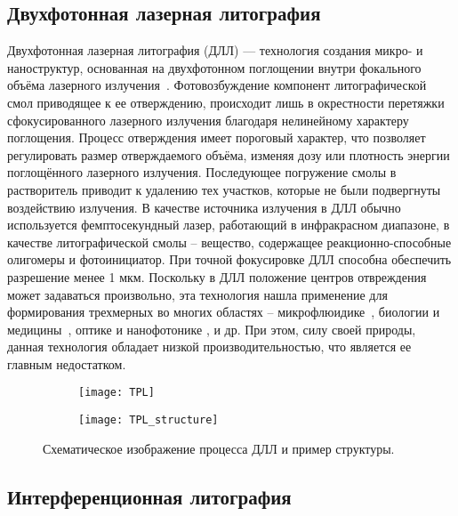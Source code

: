 \subsection{Двухфотонная лазерная литография}

Двухфотонная лазерная литография (ДЛЛ) — технология создания микро- и наноструктур, основанная на двухфотонном поглощении внутри фокального объёма лазерного излучения~\cite{Hohmann2015, Kawata2001}. Фотовозбуждение компонент литографической смол приводящее к ее отверждению, происходит лишь в окрестности перетяжки сфокусированного лазерного излучения благодаря нелинейному характеру поглощения. Процесс отверждения имеет пороговый характер, что позволяет регулировать размер отверждаемого объёма, изменяя дозу или плотность энергии поглощённого лазерного излучения. Последующее погружение смолы в растворитель приводит к удалению тех участков, которые не были подвергнуты воздействию излучения. В качестве источника излучения в ДЛЛ обычно используется фемптосекундный лазер, работающий в инфракрасном диапазоне, в качестве литографической смолы -- вещество, содержащее реакционно-способные олигомеры и фотоинициатор. При точной фокусировке ДЛЛ способна обеспечить разрешение менее 1 мкм. Поскольку в ДЛЛ положение центров отвреждения может задаваться произвольно, эта технология нашла применение для формирования трехмерных во многих областях -- микрофлюидике~\cite{TPL_microfluidics_1, TPL_microfluidics_2}, биологии и \break медицины~\cite{TPL_biology_1, TPL_biology_2}, оптике и нанофотонике \cite{TPL_optics, TPL_nanophotonics}, и др. При этом, силу своей природы, данная технология обладает низкой производительностью, что является ее главным недостатком.

\begin{figure}
	\centering
	\begin{subfigure}{.5\textwidth}
		\centering
		\texttt{[image: TPL]}
	\end{subfigure}%
	\begin{subfigure}{.5\textwidth}
		\centering
		\texttt{[image: TPL\_structure]}
	\end{subfigure}
	\caption{Схематическое изображение процесса ДЛЛ и пример структуры.}
\end{figure}


\subsection{Интерференционная литография}

